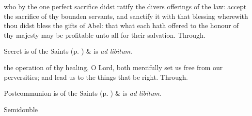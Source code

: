 
\secret
{} who by the one perfect sacrifice didst ratify the divers offerings of the law: accept the sacrifice of thy bounden servants, and sanctify it with that blessing wherewith thou didst bless the gifts of Abel: that what each hath offered to the honour of thy majesty may be profitable unto all for their salvation. Through.
\begin{rubric}
     Secret is of the Saints (p. \pageref{SPSaints}) \&  is \emph{ad libitum}.
\end{rubric}


\postcommunion
{} the operation of thy healing, O Lord, both mercifully set us free from our perversities; and lead us to the things that be right. Through.
\begin{rubric}
     Postcommunion is of the Saints (p. \pageref{SPSaints}) \&  is \emph{ad libitum}.
\end{rubric}

\begin{inhead}
{Semidouble}
\end{inhead}

\properantiphonfix

